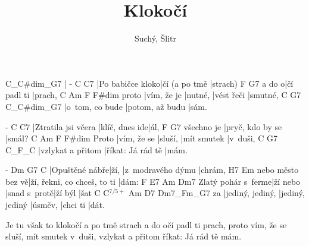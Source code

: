 \documentclass{song}
\title{Klokočí}
\author{Suchý, Šlitr}
\newcommand{\+}{$^{7/5+}$}
\begin{document}
\strophe
C_C#dim_G7
|
-                C             C7
|Po babičce kloko|čí (a po tmě |strach)
      F           G7
a do o|čí padl ti |prach,
      C           Am      F          F#dim
proto |vím, že je |nutné, |vést řeči |smutné,
C               G7              C_C#dim_G7
|o~tom, co bude |potom, až budu |sám.
\endstrophe

\strophe
-                   C              C7
|Ztratila jsi včera |klíč, dnes ide|ál,
           F                G7
všechno je |pryč, kdo by se |smál?
      C           Am      F           F#dim
Proto |vím, že se |sluší, |mít smutek |v~duši,
C                 G7                C_F_C
|vzlykat a přitom |říkat: Já rád tě |mám.
\endstrophe

\strophe
-              Dm   G7                C
|Opuštěné nábře|ží, |z~modravého dýmu |chrám,
                 H7                          Em
nebo město bez vě|ží, řekni, co chceš, to ti |dám:
                   F        E7           Am      Dm7
Zlatý pohár s~ferme|ží nebo |snad s~protě|ží býl |šat
   C                C\+             Am      D7       Dm7_Fm_G7
za |jediný, jediný, |jediný, jediný |úsměv, |chci ti |dát.
\endstrophe

\strophe*
Je tu však to klokočí a po tmě strach
a do očí padl ti prach,
proto vím, že se sluší, mít smutek v~duši,
vzlykat a přitom říkat: Já rád tě mám.
\endstrophe

\end{document}
